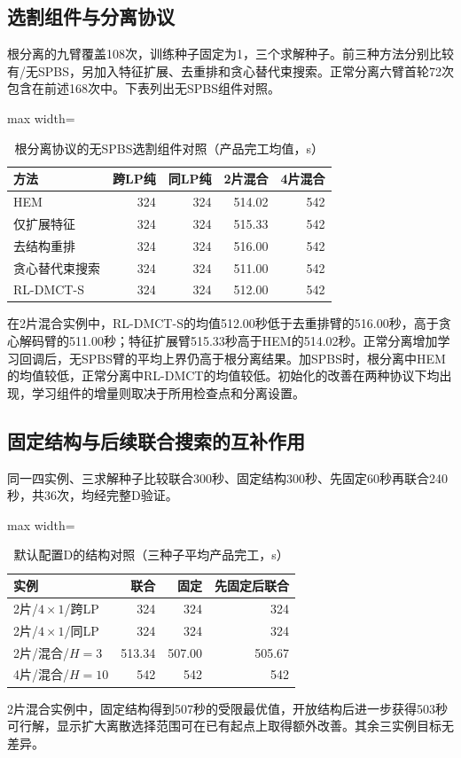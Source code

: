 \subsection{选割组件与分离协议}
根分离的九臂覆盖108次，训练种子固定为1，三个求解种子。前三种方法分别比较有/无SPBS，另加入特征扩展、去重排和贪心替代束搜索。正常分离六臂首轮72次包含在前述168次中。下表列出无SPBS组件对照。
\begin{table}[!htbp]
\centering\small
\caption{根分离协议的无SPBS选割组件对照（产品完工均值，s）}
\label{tab:journal-components-cn}

\begin{adjustbox}{max width=\linewidth}
\begin{tabular}{lrrrr}\toprule
方法 & 跨LP纯 & 同LP纯 & 2片混合 & 4片混合\\\midrule
HEM & 324 & 324 & 514.02 & 542\\
仅扩展特征 & 324 & 324 & 515.33 & 542\\
去结构重排 & 324 & 324 & 516.00 & 542\\
贪心替代束搜索 & 324 & 324 & 511.00 & 542\\
RL-DMCT-S & 324 & 324 & 512.00 & 542\\
\bottomrule\end{tabular}
\end{adjustbox}
\end{table}
在2片混合实例中，RL-DMCT-S的均值512.00秒低于去重排臂的516.00秒，高于贪心解码臂的511.00秒；特征扩展臂515.33秒高于HEM的514.02秒。正常分离增加学习回调后，无SPBS臂的平均上界仍高于根分离结果。加SPBS时，根分离中HEM的均值较低，正常分离中RL-DMCT的均值较低。初始化的改善在两种协议下均出现，学习组件的增量则取决于所用检查点和分离设置。
\subsection{固定结构与后续联合搜索的互补作用}
同一四实例、三求解种子比较联合300秒、固定结构300秒、先固定60秒再联合240秒，共36次，均经完整D验证。
\begin{table}[!htbp]
\centering\small
\caption{默认配置D的结构对照（三种子平均产品完工，s）}
\label{tab:journal-structure-cn}
\begin{adjustbox}{max width=\linewidth}
\begin{tabular}{lrrr}\toprule
实例 & 联合 & 固定 & 先固定后联合\\\midrule
2片/$4\times1$/跨LP & 324 & 324 & 324\\
2片/$4\times1$/同LP & 324 & 324 & 324\\
2片/混合/$H=3$ & 513.34 & 507.00 & 505.67\\
4片/混合/$H=10$ & 542 & 542 & 542\\
\bottomrule\end{tabular}
\end{adjustbox}
\end{table}
2片混合实例中，固定结构得到507秒的受限最优值，开放结构后进一步获得503秒可行解，显示扩大离散选择范围可在已有起点上取得额外改善。其余三实例目标无差异。
